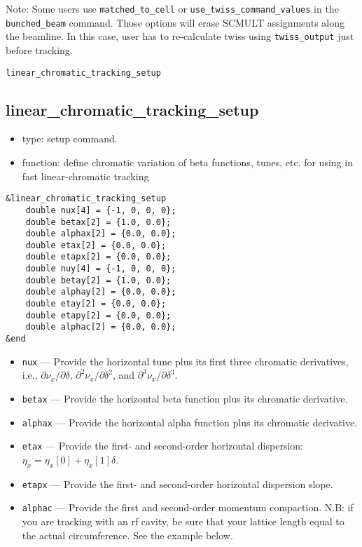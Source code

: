 \documentclass[11pt]{article}
\begin{document}
Note: Some users use \verb|matched_to_cell| or
\verb|use_twiss_command_values| in the \verb|bunched_beam|
command. Those options will erase SCMULT assignments along the
beamline. In this case, user has to re-calculate twiss using
\verb|twiss_output| just before tracking.

\begin{latexonly}
\newpage
\begin{center}{\Large\verb|linear_chromatic_tracking_setup|}\end{center}
\end{latexonly}
\subsection{linear\_chromatic\_tracking\_setup \label{subsec:linearchromatictrackingsetup}}

\begin{itemize}
\item type: setup command.
\item function: define chromatic variation of beta functions, tunes, etc. for using in
 fast linear-chromatic tracking
\end{itemize}

\begin{verbatim}
&linear_chromatic_tracking_setup
    double nux[4] = {-1, 0, 0, 0};
    double betax[2] = {1.0, 0.0};
    double alphax[2] = {0.0, 0.0};
    double etax[2] = {0.0, 0.0};
    double etapx[2] = {0.0, 0.0};
    double nuy[4] = {-1, 0, 0, 0};
    double betay[2] = {1.0, 0.0};
    double alphay[2] = {0.0, 0.0};
    double etay[2] = {0.0, 0.0};
    double etapy[2] = {0.0, 0.0};
    double alphac[2] = {0.0, 0.0};
&end
\end{verbatim}

\begin{itemize}
\item \verb|nux| --- Provide the horizontal tune plus its first three chromatic derivatives, i.e.,
  $\partial \nu_x/\partial\delta$, $\partial^2 \nu_x/\partial\delta^2$, and
  $\partial^3 \nu_x/\partial\delta^3$.
\item \verb|betax| --- Provide the horizontal beta function plus its chromatic derivative.
\item \verb|alphax| --- Provide the horizontal alpha function plus its chromatic derivative.
\item \verb|etax| --- Provide the first- and second-order horizontal dispersion:
  $\eta_x = \eta_x\left[0\right] + \eta_x\left[1\right]\delta$.
\item \verb|etapx| --- Provide the first- and second-order horizontal dispersion slope.
\item \verb|alphac| --- Provide the first and second-order momentum compaction.  N.B: if you are tracking
 with an rf cavity, be sure that your lattice length equal to the actual circumference.  See the example below.
\end{itemize}
\end{document}

